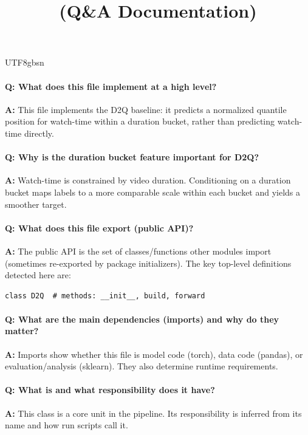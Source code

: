 \documentclass[11pt]{article}
\title{\texttt{\detokenize{model/d2q.py}} (Q\&A Documentation)}
\author{}
\date{}
\begin{document}
\begin{CJK*}{UTF8}{gbsn}
\maketitle

\paragraph{Q: What does this file implement at a high level?}
\textbf{A:} This file implements the D2Q baseline: it predicts a normalized quantile position for watch-time within a duration bucket, rather than predicting watch-time directly.

\paragraph{Q: Why is the duration bucket feature important for D2Q?}
\textbf{A:} Watch-time is constrained by video duration. Conditioning on a duration bucket maps labels to a more comparable scale within each bucket and yields a smoother target.

\paragraph{Q: What does this file export (public API)?}
\textbf{A:} The public API is the set of classes/functions other modules import (sometimes re-exported by package initializers). The key top-level definitions detected here are:

\begin{Verbatim}[fontsize=\small]
class D2Q  # methods: __init__, build, forward
\end{Verbatim}

\paragraph{Q: What are the main dependencies (imports) and why do they matter?}
\textbf{A:} Imports show whether this file is model code (torch), data code (pandas), or evaluation/analysis (sklearn). They also determine runtime requirements.

\vspace{1mm}


\paragraph{Q: What is \texttt{} and what responsibility does it have?}
\textbf{A:} This class is a core unit in the pipeline. Its responsibility is inferred from its name and how run scripts call it.


\end{CJK*}
\end{document}
